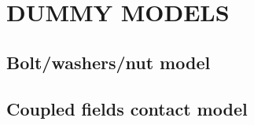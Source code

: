 \section{DUMMY MODELS}

\subsection{Bolt/washers/nut model}
\subsection{Coupled fields contact model}